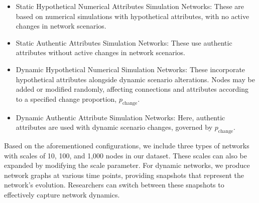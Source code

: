 \begin{itemize}
    \item Static Hypothetical Numerical Attributes Simulation Networks: These are based on numerical simulations with hypothetical attributes, with no active changes in network scenarios. 
    \item Static Authentic Attributes Simulation Networks: These use authentic attributes without active changes in network scenarios.
    \item Dynamic Hypothetical Numerical Simulation Networks: These incorporate hypothetical attributes alongside dynamic scenario alterations. Nodes may be added or modified randomly, affecting connections and attributes according to a specified change proportion, $p_{\text{change}}$.
    \item Dynamic Authentic Attribute Simulation Networks: Here, authentic attributes are used with dynamic scenario changes, governed by $p_{\text{change}}$.
\end{itemize}
Based on the aforementioned configurations, we include three types of networks with scales of 10, 100, and 1,000 nodes in our dataset. 
These scales can also be expanded by modifying the scale parameter. 
For dynamic networks, we produce network graphs at various time points, providing snapshots that represent the network's evolution. Researchers can switch between these snapshots to effectively capture network dynamics. 


